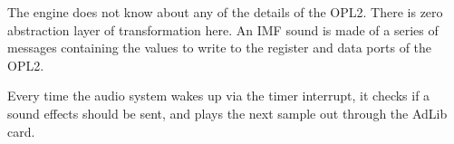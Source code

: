 \documentclass[book.tex]{subfiles}
\begin{document}
\par
The engine does not know about any of the details of the OPL2. There is zero abstraction layer of transformation here. An IMF sound is made of a series of messages containing the values to write to the register and data ports of the OPL2.\\

\par
Every time the audio system wakes up via the timer interrupt, it checks if a sound effects should be sent, and plays the next sample out through the AdLib card.\\

\par
\begin{minipage}{\textwidth}

\end{minipage}
\par
\end{document}
